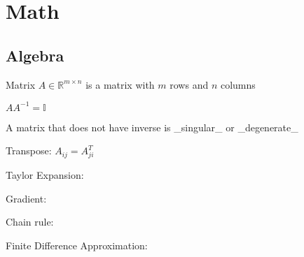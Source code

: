 \section{Math}
\subsection{Algebra}

Matrix $A \in\mathbb R^{m\times n}$ is a matrix with $m$ rows and $n$ columns

$AA^{-1}=\mathbb{I}$

A matrix that does not have inverse is _singular_ or _degenerate_

Transpose: $A_{ij} = A_{ji}^T$

Taylor Expansion:

Gradient:

Chain rule:

Finite Difference Approximation:

